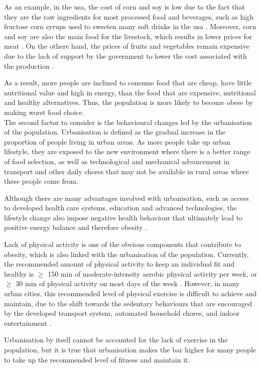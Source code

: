 As an example, in the \gls{usa}, the cost of corn and soy is low due to the fact that they are the raw ingredients for most processed food and beverages, such as high fructose corn syrups used to sweeten many soft drinks in the \gls{usa} \citep{Malik2013}.
Moreover, corn and soy are also the main food for the livestock, which results in lower prices for meat \citep{Malik2013}.
On the othere hand, the prices of fruits and vegetables remain expensive due to the lack of support by the government to lower the cost associated with the production \citep{Malik2013}.

As a result, more people are inclined to consume food that are cheap, have little nutritional value and high in energy, than the food that are expensive, nutritional and healthy alternatives.
Thus, the population is more likely to become obese by making worst food choice.\\

\noindent
The second factor to consider is the behavioural changes led by the urbanisation of the population.
Urbanisation is defined as the gradual increase in the proportion of people living in urban areas.
As more people take up urban lifestyle, they are exposed to the new environment where there is a better range of food selection, as well as technological and mechanical advancement in transport and other daily chores that may not be available in rural areas where these people come from.

Although there are many advantages involved with urbanisation, such as access to developed health care systems, education and advanced technologies, the lifestyle change also impose negative health behaviour that ultimately lead to positive energy balance and therefore obesity \citep{Malik2013}.

Lack of physical activity is one of the obvious components that contribute to obesity, which is also linked with the urbanisation of the population.
Currently, the recommended amount of physical activity to keep an individual fit and healthy is $\geq$ 150 min of moderate-intensity aerobic physical activity per week, or $\geq$ 30 min of physical activity on most days of the week \citep{Pate1995, WHO2010}.
However, in many urban cities, this recommended level of physical exercise is difficult to achieve and maintain, due to the shift towards the sedentary behaviours that are encouraged by the developed transport system, automated household chores, and indoor entertainment \citep{Malik2013}.

Urbanisation by itself cannot be accounted for the lack of exercise in the population, but it is true that urbanisation makes the bar higher for many people to take up the recommended level of fitness and maintain it. \\


